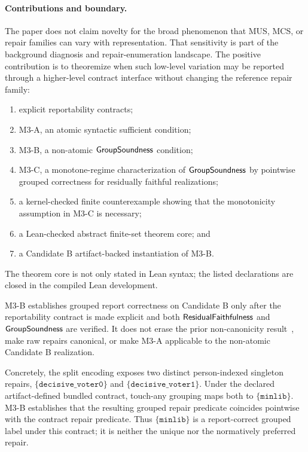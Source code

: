 \paragraph{Contributions and boundary.}
The paper does not claim novelty for the broad phenomenon that MUS, MCS, or
repair families can vary with representation.  That sensitivity is part of the
background diagnosis and repair-enumeration landscape.  The positive
contribution is to theoremize when such low-level variation may be reported
through a higher-level contract interface without changing the reference repair
family:
\begin{enumerate}[label=(\roman*)]
  \item explicit reportability contracts;
  \item M3-A, an atomic syntactic sufficient condition;
  \item M3-B, a non-atomic \(\mathsf{GroupSoundness}\) condition;
  \item M3-C, a monotone-regime characterization of \(\mathsf{GroupSoundness}\) by
    pointwise grouped correctness for residually faithful realizations;
  \item a kernel-checked finite counterexample showing that the monotonicity
    assumption in M3-C is necessary;
  \item a Lean-checked abstract finite-set theorem core; and
  \item a Candidate B artifact-backed instantiation of M3-B.
\end{enumerate}

The theorem core is not only stated in Lean syntax; the listed declarations
are closed in the compiled Lean development.

M3-B establishes grouped report correctness on Candidate B only after the
reportability contract is made explicit and both \(\mathsf{ResidualFaithfulness}\) and
\(\mathsf{GroupSoundness}\) are verified.
It does not erase the prior non-canonicity result~\citep{hayashida2026repair},
make raw repairs canonical, or make M3-A applicable to the non-atomic
Candidate B realization.

Concretely, the split encoding exposes two distinct person-indexed singleton
repairs,
\(\{\mathtt{decisive\_voter0}\}\) and
\(\{\mathtt{decisive\_voter1}\}\).  Under the declared artifact-defined
bundled contract, touch-any grouping maps both to
\(\{\mathtt{minlib}\}\).  M3-B establishes that the resulting grouped repair
predicate coincides pointwise with the contract repair predicate.  Thus
\(\{\mathtt{minlib}\}\) is a report-correct grouped label under this contract;
it is neither the unique nor the normatively preferred repair.

